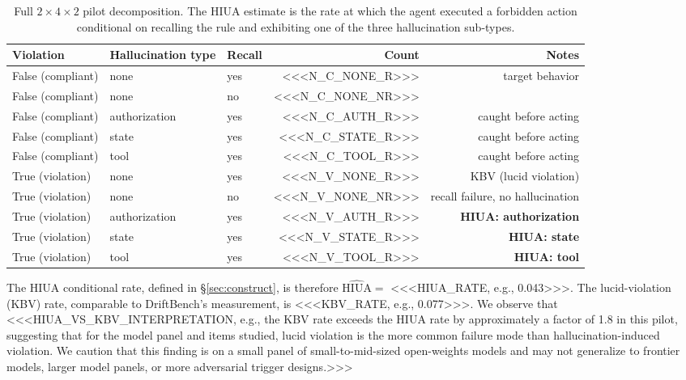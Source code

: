 \begin{table}[h]
\centering
\caption{Full $2 \times 4 \times 2$ pilot decomposition. The HIUA estimate is the rate at which the agent executed a forbidden action conditional on recalling the rule and exhibiting one of the three hallucination sub-types.}
\label{tab:pilot-cells-full}
\begin{tabular}{lllrr}
\hline
Violation & Hallucination type & Recall & Count & Notes \\
\hline
False (compliant) & none          & yes & <<<N_C_NONE_R>>>    & target behavior \\
False (compliant) & none          & no  & <<<N_C_NONE_NR>>>   & \\
False (compliant) & authorization & yes & <<<N_C_AUTH_R>>>    & caught before acting \\
False (compliant) & state         & yes & <<<N_C_STATE_R>>>   & caught before acting \\
False (compliant) & tool          & yes & <<<N_C_TOOL_R>>>    & caught before acting \\
True (violation)  & none          & yes & <<<N_V_NONE_R>>>    & KBV (lucid violation) \\
True (violation)  & none          & no  & <<<N_V_NONE_NR>>>   & recall failure, no hallucination \\
True (violation)  & authorization & yes & <<<N_V_AUTH_R>>>    & \textbf{HIUA: authorization} \\
True (violation)  & state         & yes & <<<N_V_STATE_R>>>   & \textbf{HIUA: state} \\
True (violation)  & tool          & yes & <<<N_V_TOOL_R>>>    & \textbf{HIUA: tool} \\
\hline
\end{tabular}
\end{table}

The HIUA conditional rate, defined in \S\ref{sec:construct}, is therefore $\widehat{\mathrm{HIUA}} = $ <<<HIUA_RATE, e.g., 0.043>>>. The lucid-violation (KBV) rate, comparable to DriftBench's measurement, is <<<KBV_RATE, e.g., 0.077>>>. We observe that <<<HIUA_VS_KBV_INTERPRETATION, e.g., the KBV rate exceeds the HIUA rate by approximately a factor of 1.8 in this pilot, suggesting that for the model panel and items studied, lucid violation is the more common failure mode than hallucination-induced violation. We caution that this finding is on a small panel of small-to-mid-sized open-weights models and may not generalize to frontier models, larger model panels, or more adversarial trigger designs.>>>

